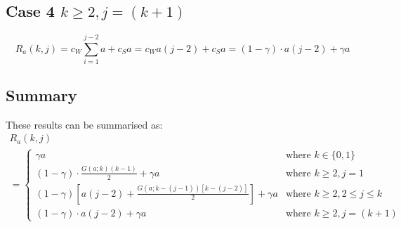 \subsection{Case 4 $k \geq 2, j = (k + 1)$}
\begin{equation*}
	R_{a} (k, j) = c_{W} \sum_{i = 1}^{j - 2} a + c_{S} a = c_{W} a (j - 2) + c_{S} a = (1 - \gamma) \cdot a (j - 2) + \gamma a
\end{equation*}

\subsection{Summary}
These results can be summarised as:
\begin{multline}
	R_{a} (k, j) \\
	= \begin{cases}
		\gamma a & \text{where $k \in \{ 0, 1 \}$} \\
		(1 - \gamma) \cdot \frac{G (a; k) (k - 1)}{2} + \gamma a & \text{where $k \geq 2, j = 1$} \\
		(1 - \gamma) \left[ a (j - 2) + \frac{G (a; k - (j - 1)) [k - (j - 2)]}{2} \right] + \gamma a & \text{where $k \geq 2, 2 \leq j \leq k$} \\
		(1 - \gamma) \cdot a (j - 2) + \gamma a & \text{where $k \geq 2, j = (k + 1)$}
	\end{cases}
\end{multline}


















































